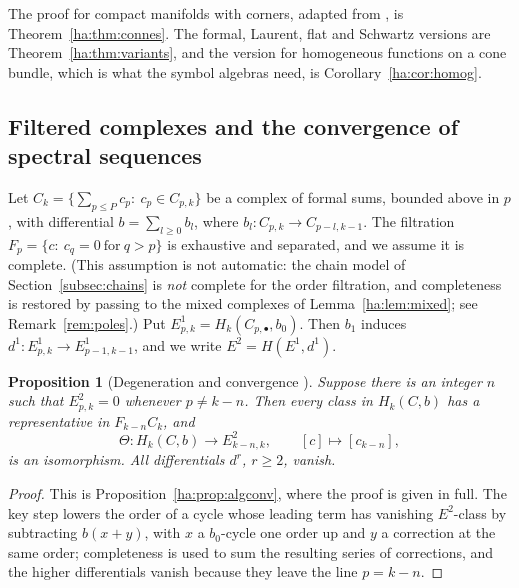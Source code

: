\documentclass[11pt,oneside,reqno]{article}
\theoremstyle{plain}
\newtheorem{proposition}[theorem]{Proposition}
\theoremstyle{definition}
\theoremstyle{remark}
\begin{document}
The proof for compact manifolds with corners, adapted from
\cite[Ch.~10]{MelroseMicro}, is Theorem~\ref{ha:thm:connes}. The formal,
Laurent, flat and Schwartz versions are Theorem~\ref{ha:thm:variants}, and
the version for homogeneous functions on a cone bundle, which is what the
symbol algebras need, is Corollary~\ref{ha:cor:homog}.

\subsection{Filtered complexes and the convergence of spectral sequences}
\label{subsec:convergence}
Let \(C_k=\{\sum_{p\le P}c_p:\ c_p\in C_{p,k}\}\) be a complex of formal
sums, bounded above in \(p\), with differential \(b=\sum_{l\ge0}b_l\),
where \(b_l:C_{p,k}\to C_{p-l,k-1}\). The filtration \(F_p=\{c:\ c_q=0\
\text{for}\ q>p\}\) is exhaustive and separated, and we assume it is
complete. (This assumption is not automatic: the chain model of
Section~\ref{subsec:chains} is \emph{not} complete for the order
filtration, and completeness is restored by passing to the mixed complexes
of Lemma~\ref{ha:lem:mixed}; see Remark~\ref{rem:poles}.) Put
\(E^1_{p,k}=H_k(C_{p,\bullet},b_0)\). Then \(b_1\) induces
\(d^1:E^1_{p,k}\to E^1_{p-1,k-1}\), and we write \(E^2=H(E^1,d^1)\).

\begin{proposition}[Degeneration and convergence {\cite[Prop.~``convergence'']{MelroseMicro}}]
\label{prop:convergence}
Suppose there is an integer \(n\) such that \(E^2_{p,k}=0\) whenever
\(p\ne k-n\). Then every class in \(H_k(C,b)\) has a representative in
\(F_{k-n}C_k\), and
\[
 \Theta:H_k(C,b)\to E^2_{k-n,k},\qquad[c]\mapsto[c_{k-n}],
\]
is an isomorphism. All differentials \(d^r\), \(r\ge2\), vanish.
\end{proposition}

\begin{proof}
This is Proposition~\ref{ha:prop:algconv}, where the proof is given in
full. The key step lowers the order of a cycle whose leading term has
vanishing \(E^2\)-class by subtracting \(b(x+y)\), with \(x\) a
\(b_0\)-cycle one order up and \(y\) a correction at the same order;
completeness is used to sum the resulting series of corrections, and the
higher differentials vanish because they leave the line \(p=k-n\).
\end{proof}
\end{document}
